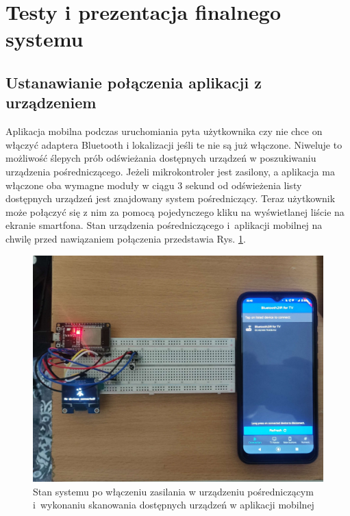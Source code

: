 \documentclass[12pt,twoside]{article}
\begin{document}

\clearpage



\section{Testy i prezentacja finalnego systemu}
\subsection{Ustanawianie połączenia aplikacji z urządzeniem}
Aplikacja mobilna podczas uruchomiania pyta użytkownika czy nie chce on włączyć adaptera Bluetooth i lokalizacji jeśli te nie są już włączone. Niweluje to możliwość ślepych prób odświeżania dostępnych urządzeń w poszukiwaniu urządzenia pośredniczącego. Jeżeli mikrokontroler jest zasilony, a aplikacja ma włączone oba wymagne moduły w ciągu 3 sekund od odświeżenia listy dostępnych urządzeń jest znajdowany system pośredniczący. Teraz użytkownik może połączyć się z nim za pomocą pojedynczego kliku na wyświetlanej liście na ekranie smartfona. Stan urządzenia pośredniczącego i~aplikacji mobilnej na chwilę przed nawiązaniem połączenia przedstawia Rys. \ref*{Fig:scanTest}.

\begin{figure}[ht]
   \centering
   \includegraphics[width=13cm]{images/scanTest.jpg}
   \caption{Stan systemu po włączeniu zasilania w urządzeniu pośredniczącym i~wykonaniu skanowania dostępnych urządzeń w aplikacji mobilnej}
   \label{Fig:scanTest}
\end{figure}
\end{document}
